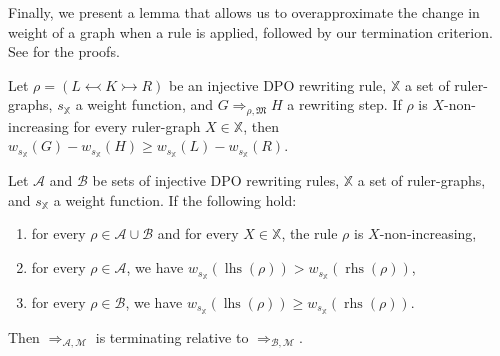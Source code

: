 Finally, we present a lemma that allows us to overapproximate the change in weight of a graph when a rule is applied, followed by our termination criterion. See \cite[Lemma 41, 42]{qiu2025termination} for the proofs.

\begin{lemma}
    \label{lem:w_g_geq_w_h_leq}
    Let $\rho = (L \overset{}{\leftarrowtail} K \overset{}{\rightarrowtail} R)$ be an injective DPO rewriting rule,
    \( \mathbb{X} \) a set of ruler-graphs,
    \( s_{\mathbb{X}}\) a weight function,
    and \( G \Rightarrow_{\rho,\mathfrak{M}} H \) a rewriting step. 
    If $\rho$ is \( X \)-non-increasing for every ruler-graph \( X \in \mathbb{X} \), then $
        w_{s_\mathbb{X}}(G) - w_{s_\mathbb{X}}(H) 
        \geq 
        w_{s_\mathbb{X}}(L) - w_{s_\mathbb{X}}(R)
    $.
\end{lemma}
\begin{theorem}[Termination] 
    \label{thm:termination_grs}
    Let \(\mathcal{A}\) and \(\mathcal{B}\) be sets of injective DPO rewriting rules, $\mathbb{X}$ a set of ruler-graphs, and $s_\mathbb{X}$ a weight function. If the following hold:
    \begin{enumerate}
        \item  for every $\rho \in \mathcal{A} \cup \mathcal{B}$ and for every $X \in \mathbb{X}$, the rule $\rho$ is $X$-non-increasing,
        \item for every \(\rho \in \mathcal{A}\), we have \( w_{s_\mathbb{X}}(\operatorname{lhs}(\rho)) > w_{s_\mathbb{X}}(\operatorname{rhs}(\rho)) \),
        \item for every \(\rho \in \mathcal{B}\), we have \( w_{s_\mathbb{X}}(\operatorname{lhs}(\rho)) \geq w_{s_\mathbb{X}}(\operatorname{rhs}(\rho)) \).
    \end{enumerate}
    Then \(\Rightarrow_{\mathcal{A},\mathcal{M}}\) is terminating relative to \(\Rightarrow_{\mathcal{B},\mathcal{M}}\).
\end{theorem}